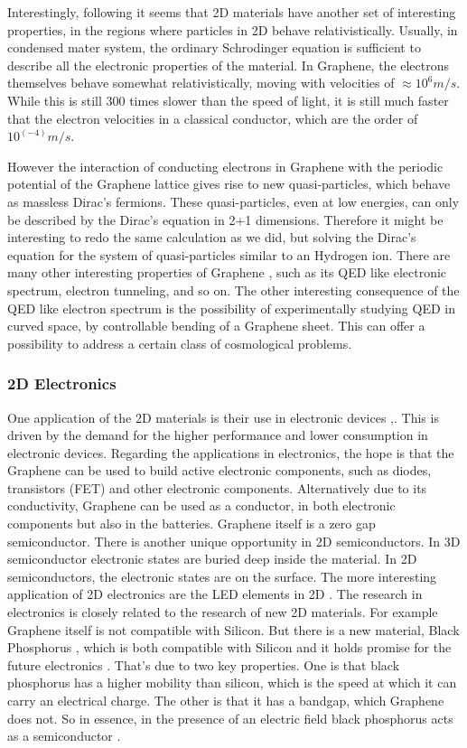Interestingly, following \cite{Graphene0} it seems that 2D materials have another set of interesting properties, in the regions where particles in 2D behave relativistically. Usually, in condensed mater system, the ordinary Schrodinger equation is sufficient to describe all the electronic properties of the material. In Graphene, the electrons themselves behave somewhat relativistically, moving with velocities of $ \approx 10^6 m/s $. While this is still 300 times slower than the speed of light, it is still much faster that the electron velocities in a classical conductor, which are the order of $ 10^(-4) m/s $.

However the interaction of conducting electrons in Graphene with the periodic potential of the Graphene lattice gives rise to new quasi-particles, which behave as massless Dirac's fermions. These quasi-particles, even at low energies, can only be described by the Dirac's equation in 2+1 dimensions. Therefore it might be interesting to redo the same calculation as we did, but solving the Dirac's equation for the system of quasi-particles similar to an Hydrogen ion.  There are many other interesting properties of Graphene \cite{Graphene0}, such as its QED like electronic spectrum, electron tunneling, and so on. The other interesting consequence of the QED like electron spectrum is the possibility of experimentally studying QED in curved space, by controllable bending of a Graphene sheet. This can offer a possibility to address a certain class of cosmological problems. 

\subsubsection*{2D Electronics}

One application of the 2D materials is their use in electronic devices \cite{2DEJour1},\cite{2DEJour2}. This is driven by the demand for the higher performance and lower consumption in electronic devices.
Regarding the applications in electronics, the hope is that the Graphene can be used to build active electronic components, such as diodes, transistors (FET) and other electronic components. Alternatively due to its conductivity, Graphene can be used as a conductor, in both electronic components but also in the batteries. Graphene itself is a zero gap semiconductor. There is another unique opportunity in 2D semiconductors. In 3D semiconductor electronic states are buried deep inside the material. In 2D semiconductors, the electronic states are on the surface. The more interesting application of 2D electronics are the LED elements in 2D \cite{2DLED}. The research in electronics is closely related to the research of new 2D materials. For example Graphene itself is not compatible with Silicon. But there is a new material, Black Phosphorus \cite{2DPhos}, which is both compatible with Silicon and it holds promise for the future electronics \cite{2DPhos3}. That's due to two key properties. One is that black phosphorus has a higher mobility than silicon, which is the speed at which it can carry an electrical charge. The other is that it has a bandgap, which Graphene does not. So in essence, in the presence of an electric field black phosphorus acts as a semiconductor \cite{2DPhos2}.

